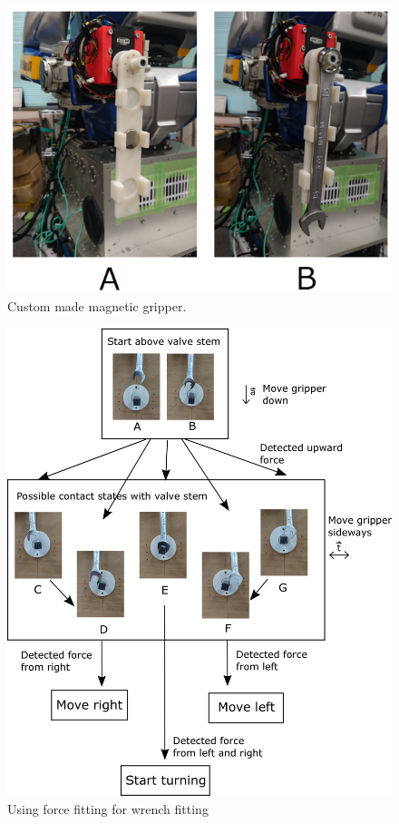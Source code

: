 \documentclass{standalone}
\begin{document}
\begin{figure}
  \includegraphics{sections/task2/images/figure2}
  \caption{Custom made magnetic gripper.}
  \label{fig:figure2}
\end{figure}


\begin{figure}
  \includegraphics[width=\columnwidth]{sections/task2/images/figure3}
  \caption{Using force fitting for wrench fitting}
  \label{fig:figure3}
\end{figure}
\end{document}
